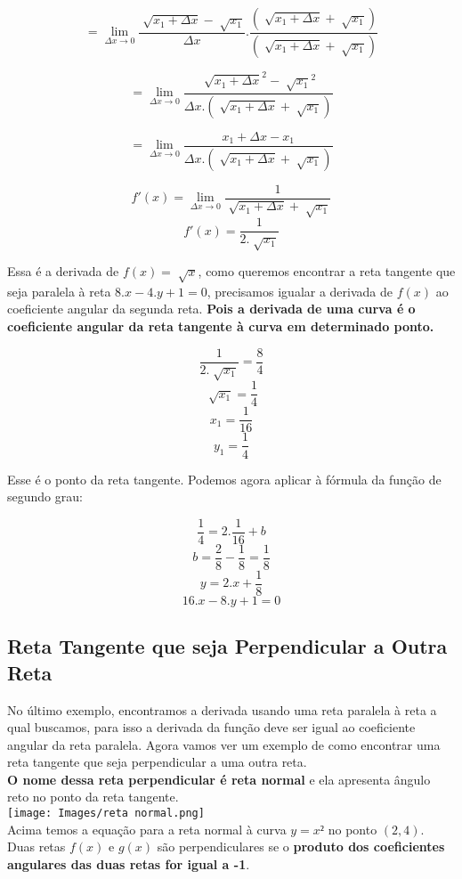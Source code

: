\documentclass[ ]{article}
\begin{document}
		$$= \lim_{\Delta x\to 0}\dfrac{\sqrt[]{x_1 + \Delta x}-\sqrt[ ]{x_1}}{\Delta x}.\dfrac{(\sqrt[ ]{x_1+\Delta x}+\sqrt[ ]{x_1})}{(\sqrt[ ]{x_1+\Delta x}+\sqrt[ ]{x_1})}$$

		$$= \lim_{\Delta x \to 0}\dfrac{\sqrt[ ]{x_1+\Delta x}^2-\sqrt[ ]{x_1}^2}  {\Delta x.(\sqrt[ ]{x_1 + \Delta x}+ \sqrt[ ]{x_1})}$$		
		
		$$= \lim_{\Delta x \to 0}\dfrac{x_1+\Delta x-x_1}{\Delta x.(\sqrt[ ]{x_1 + \Delta x}+ \sqrt[ ]{x_1})}$$
		
		$$f'(x) = \lim_{\Delta x\to 0}\dfrac{1}{\sqrt[ ]{x_1+\Delta x}+ \sqrt[ ]{x_1}}$$
		$$f'(x) = \dfrac{1}{2.\sqrt[ ]{x_1}}$$
		
		Essa é a derivada de $f(x) = \sqrt[ ]{x}$, como queremos encontrar a reta tangente que seja paralela à reta $8.x-4.y+1=0$, precisamos igualar a derivada de $f(x)$ ao coeficiente angular da segunda reta. \textbf{Pois a derivada de uma curva é o coeficiente angular da reta tangente à curva em determinado ponto.}
		
		$$\dfrac{1}{2.\sqrt[ ]{x_1}}=\dfrac{8}{4}$$
		$$\sqrt[ ]{x_1}=\dfrac{1}{4}$$
		$$x_1 = \dfrac{1}{16}$$
		$$y_1 = \dfrac{1}{4}$$

		Esse é o ponto da reta tangente. Podemos agora aplicar à fórmula da função de segundo grau:

		$$\dfrac{1}{4}=2.\dfrac{1}{16}+b$$
		$$b =\dfrac{2}{8}-\dfrac{1}{8}=\dfrac{1}{8}$$
		$$y=2.x+\dfrac{1}{8}$$
		$$16.x-8.y+1=0$$
		
	\subsection{Reta Tangente que seja Perpendicular a Outra Reta}
		No último exemplo, encontramos a derivada usando uma reta paralela à reta a qual buscamos, para isso a derivada da função deve ser igual ao coeficiente angular da reta paralela. Agora vamos ver um exemplo de como encontrar uma reta tangente que seja perpendicular a uma outra reta.\\
		\textbf{O nome dessa reta perpendicular é reta normal} e ela apresenta ângulo reto no ponto da reta tangente.\\
		\texttt{[image: Images/reta normal.png]}
		\\
		Acima temos a equação para a reta normal à curva $y = x²$ no ponto $(2,4)$.\\
		Duas retas $f(x)$ e $g(x)$ são perpendiculares se o \textbf{produto dos coeficientes angulares das duas retas for igual a -1}.
\end{document}
